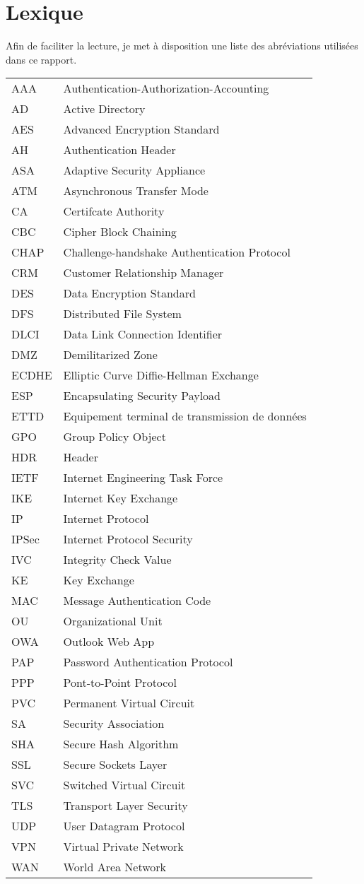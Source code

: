 \chapter*{Lexique}
Afin de faciliter la lecture, je met à disposition une liste des abréviations utilisées dans ce rapport.

\begin{longtable}{ll}
AAA & Authentication-Authorization-Accounting\\
AD & Active Directory\\
AES & Advanced Encryption Standard\\
AH & Authentication Header\\
ASA & Adaptive Security Appliance\\
ATM & Asynchronous Transfer Mode\\
CA & Certifcate Authority\\
CBC & Cipher Block Chaining\\
CHAP & Challenge-handshake Authentication Protocol\\
CRM & Customer Relationship Manager\\
DES & Data Encryption Standard\\
DFS & Distributed File System\\
DLCI & Data Link Connection Identifier\\
DMZ & Demilitarized Zone\\
ECDHE & Elliptic Curve Diffie-Hellman Exchange\\
ESP & Encapsulating Security Payload\\
ETTD & Equipement terminal de transmission de données\\
GPO & Group Policy Object\\
HDR & Header\\
IETF & Internet Engineering Task Force\\
IKE & Internet Key Exchange\\
IP & Internet Protocol\\
IPSec & Internet Protocol Security\\
IVC & Integrity Check Value\\
KE & Key Exchange\\
MAC & Message Authentication Code\\
OU & Organizational Unit\\
OWA & Outlook Web App\\
PAP & Password Authentication Protocol\\
PPP & Pont-to-Point Protocol\\
PVC & Permanent Virtual Circuit\\
SA & Security Association\\
SHA & Secure Hash Algorithm\\
SSL & Secure Sockets Layer\\
SVC & Switched Virtual Circuit\\
TLS & Transport Layer Security\\
UDP & User Datagram Protocol\\
VPN & Virtual Private Network\\
WAN & World Area Network\\
\end{longtable}